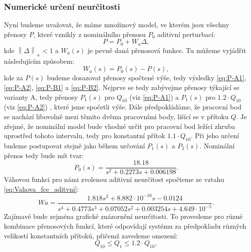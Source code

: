 \documentclass[a4paper,11pt]{article}
\begin{document}
\subsubsection{Numerické určení neurčitosti}
Nyní budeme uvažovat, že máme množinový model, ve kterém jsou všechny přenosy $ P $, které vznikly z nominálního přenosu $ P_{0} $ aditivní perturbací:
\begin{equation}\label{eq:Aditivni_neurcitost-zakladni_vztah} 
P = P_{0}+W_{a}\Delta,
\end{equation}
kde $ \left\| \Delta   \right \|_{_{\infty }}< 1 $ a $ W_{a}\left ( s \right ) $ je pevně daná přenosová funkce. Tu můžeme vyjádřit následujícím způsobem:
\begin{equation}\label{eq:Vahova_fce_aditvni} 
W_{a}\left ( s \right ) = P_{0}\left ( s \right )-P\left ( s \right ),
\end{equation}
kde za $ P\left ( s \right ) $ budeme dosazovat přenosy spočtené výše, tedy výsledky \ref{eq:P-A1}, \ref{eq:P-A2}, \ref{eq:P-B1} a \ref{eq:P-B2}. Nejprve se tedy zabývejme přenosy týkající se varianty A, tedy přenosy $ P_{1}\left ( s \right ) $ pro $ Q_{10} $ (viz \ref{eq:P-A1}) a $ P_{1}\left ( s \right ) $ pro $ 1.2\cdot Q_{10} $ (viz \ref{eq:P-A2}) , které jsme spočetli výše. Dále předpokládáme, že pracovní bod se nachází libovolně mezi těmito dvěma pracovními body, lišící se v přítoku $ Q $. Je zřejmé, že nominální model bude vhodné určit pro pracovní bod ležící zhruba uprostřed tohoto intervalu, tedy pro konstantní přítok $ 1.1\cdot Q_{10} $. Při jeho určení budeme postupovat stejně jako během určování $ P_{1}\left ( s \right ) $ a $ P_{2}\left ( s \right ) $. Nominální přenos tedy bude mít tvar:
\begin{equation}\label{eq:P-A0} 
P_{0}\left ( s \right ) =\frac{18.18}{s^{2} + 0.2273 s + 0.006198}.
\end{equation}
Váhovou funkci pro námi zvolenou aditivní neurčitost spočteme ze vztahu \ref{eq:Vahova_fce_aditvni}:   
\begin{equation}\label{eq:Wa-A}
Wa = \frac{1.818 s^{2} + 8.882\cdot 10^{-16}s - 0.0124}{s^{4} + 0.4773 s^{3} + 0.07052 s^{2} + 0.003254 s + 4.649\cdot 10^{-5}}.
\end{equation} 
Zajímavé bude zejména grafické znázornění neurčitosti. To provedeme pro různé kombinace přenosových funkcí, které odpovídají systému za předpokladu různých velikostí konstantních přítoků, přičemž zavedeme omezení: 
\begin{equation}
\label{eq:Q_omezeni} 
Q_{10} \leq Q_{1} \leq 1.2\cdot Q_{10}, 
\end{equation}
\end{document}
